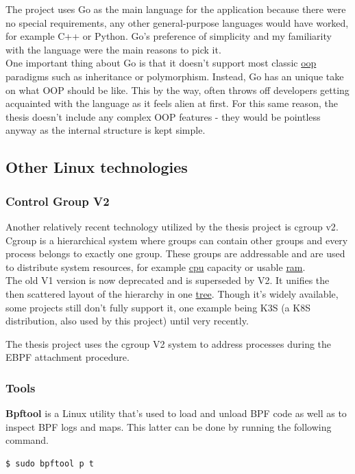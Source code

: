 The project uses Go as the main language for the application because there were no special requirements, any other general-purpose languages would have worked, for example C++ or Python. Go's preference of simplicity and my familiarity with the language were the main reasons to pick it. \\

One important thing about Go is that it doesn't support most classic \underline{\gls{oop}} paradigms such as inheritance or polymorphism. Instead, Go has an unique take on what OOP should be like. This by the way, often throws off developers getting acquainted with the language as it feels alien at first. For this same reason, the thesis doesn't include any complex OOP features - they would be pointless anyway as the internal structure is kept simple.

\newpage
\subsection{Other Linux technologies}
\subsubsection{Control Group V2}
Another relatively recent technology utilized by the thesis project is cgroup v2\cite{cgroup}. Cgroup is a hierarchical system where groups can contain other groups and every process belongs to exactly one group. These groups are addressable and are used to distribute system resources, for example \underline{\gls{cpu}} capacity or usable \underline{\gls{ram}}. \\

The old V1 version is now deprecated and is superseded by V2. It unifies the then scattered layout of the hierarchy in one \underline{\gls{tree}}. Though it's widely available, some projects still don't fully support it, one example being K3S (a K8S distribution, also used by this project) until very recently.

The thesis project uses the cgroup V2 system to address processes during the EBPF attachment procedure.

\subsubsection{Tools}
\textbf{Bpftool}\cite{bpftool} is a Linux utility that's used to load and unload BPF code as well as to inspect BPF logs and maps. This latter can be done by running the following command.
\begin{verbatim}
$ sudo bpftool p t
\end{verbatim}

